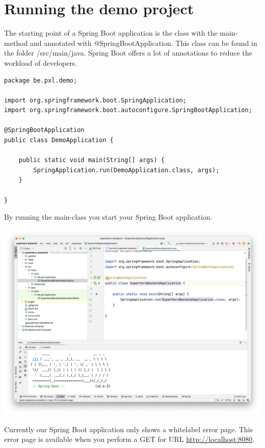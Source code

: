 \documentclass[a4paper, 12pt]{report}
\begin{document}
\section{Running the demo project}

The starting point of a Spring Boot application is the class with the main-method and annotated with @SpringBootApplication.  This class can be found in the folder /src/main/java.  Spring Boot offers a lot of annotations to reduce the workload of developers.   

\begin{lstlisting}[frame=single]
package be.pxl.demo;

import org.springframework.boot.SpringApplication;
import org.springframework.boot.autoconfigure.SpringBootApplication;

@SpringBootApplication
public class DemoApplication {

    public static void main(String[] args) {
        SpringApplication.run(DemoApplication.class, args);
    }

}
\end{lstlisting}

By running the main-class you start your Spring Boot application. 

\includegraphics[width=\textwidth]{./images/chapter2/first-run.png}

Currently our Spring Boot application only shows a whitelabel error page. This error page is available when you perform a GET for URL \url{http://localhost:8080}.

\end{document}
